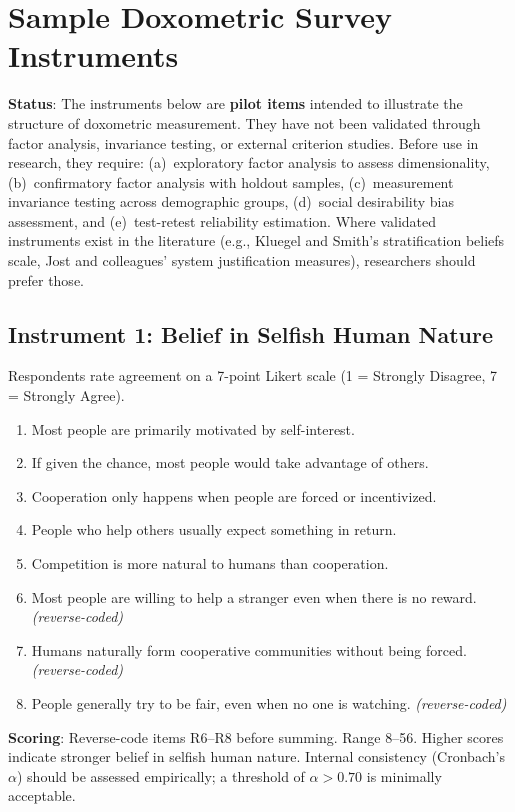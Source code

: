 \chapter{Sample Doxometric Survey Instruments}
\label{app:survey}

\textbf{Status}: The instruments below are \textbf{pilot items} intended to illustrate the structure of doxometric measurement.
They have not been validated through factor analysis, invariance testing, or external criterion studies.
Before use in research, they require: (a)~exploratory factor analysis to assess dimensionality, (b)~confirmatory factor analysis with holdout samples, (c)~measurement invariance testing across demographic groups, (d)~social desirability bias assessment, and (e)~test-retest reliability estimation.
Where validated instruments exist in the literature (e.g., Kluegel and Smith's stratification beliefs scale, Jost and colleagues' system justification measures), researchers should prefer those.

\section*{Instrument 1: Belief in Selfish Human Nature}

Respondents rate agreement on a 7-point Likert scale (1 = Strongly Disagree, 7 = Strongly Agree).

\begin{enumerate}[nosep]
  \item Most people are primarily motivated by self-interest.
  \item If given the chance, most people would take advantage of others.
  \item Cooperation only happens when people are forced or incentivized.
  \item People who help others usually expect something in return.
  \item Competition is more natural to humans than cooperation.
  \item[\textbf{R6.}] Most people are willing to help a stranger even when there is no reward. \textit{(reverse-coded)}
  \item[\textbf{R7.}] Humans naturally form cooperative communities without being forced. \textit{(reverse-coded)}
  \item[\textbf{R8.}] People generally try to be fair, even when no one is watching. \textit{(reverse-coded)}
\end{enumerate}

\textbf{Scoring}: Reverse-code items R6--R8 before summing. Range 8--56. Higher scores indicate stronger belief in selfish human nature.
Internal consistency (Cronbach's $\alpha$) should be assessed empirically; a threshold of $\alpha > 0.70$ is minimally acceptable.

